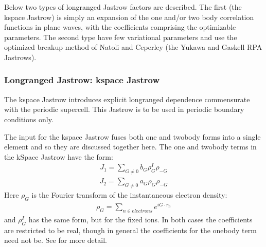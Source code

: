 \documentclass[letterpaper,10pt,english]{sphinxmanual}
\begin{document}
Below two types of long\sphinxhyphen{}ranged Jastrow factors are described. The first
(the k\sphinxhyphen{}space Jastrow) is simply an expansion of the one and/or two body
correlation functions in plane waves, with the coefficients comprising
the optimizable parameters. The second type have few variational
parameters and use the optimized breakup method of Natoli and
Ceperley  (the Yukawa and Gaskell RPA
Jastrows).


\subsubsection{Long\sphinxhyphen{}ranged Jastrow: k\sphinxhyphen{}space Jastrow}
\label{\detokenize{intro_wavefunction:long-ranged-jastrow-k-space-jastrow}}
The k\sphinxhyphen{}space Jastrow introduces explicit long\sphinxhyphen{}ranged dependence commensurate with the periodic supercell.  This Jastrow is to be used in periodic boundary conditions only.

The input for the k\sphinxhyphen{}space Jastrow fuses both one and two\sphinxhyphen{}body forms into a single element and so they are discussed together here.  The one\sphinxhyphen{} and two\sphinxhyphen{}body terms in the k\sphinxhyphen{}Space Jastrow have the form:
\begin{equation}\label{equation:intro_wavefunction:eq15}
\begin{split}J_1 = \sum_{G\ne 0}b_G\rho_G^I\rho_{-G}\end{split}
\end{equation}\begin{equation}\label{equation:intro_wavefunction:eq16}
\begin{split}J_2 = \sum_{G\ne 0}a_G\rho_G\rho_{-G}\end{split}
\end{equation}
Here \(\rho_G\) is the Fourier transform of the instantaneous electron density:
\begin{equation}\label{equation:intro_wavefunction:eq17}
\begin{split}\rho_G=\sum_{n\in electrons}e^{iG\cdot r_n}\end{split}
\end{equation}
and \(\rho_G^I\) has the same form, but for the fixed ions. In both cases the coefficients are restricted to be real, though in general the coefficients for the one\sphinxhyphen{}body term need not be.  See  for more detail.
\end{document}
